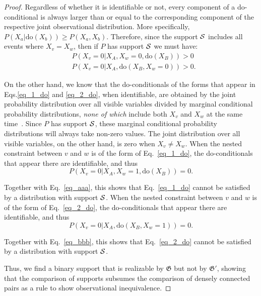 \begin{proof}
	Regardless of whether it is identifiable or not, every component of a do-conditional is always larger than or equal to the corresponding component of the respective joint observational distribution. More specifically, $P(X_a|\text{do}(X_b))\geq P(X_a,X_b)$. Therefore, since the support $\cal S$ includes all events where $X_v= X_w$, then if $P$ has support $\cal S$ we must have:
	\begin{align}
		& P(X_v=0|X_A,X_w=0,\text{do}(X_B)) >0 \label{eq_aaa} \\
		& P(X_v=0|X_A,\text{do}(X_B, X_w=0)) >0.  \label{eq_bbb}
	\end{align}
	
	On the other hand, we know that the do-conditionals of the forms that appear in Eqs.\eqref{eq_1_do} and \eqref{eq_2_do}, when identifiable, are obtained by the joint probability distribution over all visible variables divided by marginal conditional probability distributions, \emph{none of which} include both $X_v$ and $X_w$ at the same time~\cite{causality_pearl}. Since $P$ has support $\cal S$, these marginal conditional probability distributions will always take non-zero values. The joint distribution over all visible variables, on the other hand, is zero when $X_v\neq X_w$. When the nested constraint between $v$ and $w$ is of the form of Eq.~\eqref{eq_1_do}, the do-conditionals that appear there are identifiable, and thus
	\begin{equation}
		P(X_v=0|X_A,X_w=1,\text{do}(X_B)) =0.
	\end{equation}
	
	Together with Eq.~\eqref{eq_aaa}, this shows that Eq.~\eqref{eq_1_do} cannot be satisfied by a distribution with support $\cal S$.  When the nested constraint between $v$ and $w$ is of the form of Eq.~\eqref{eq_2_do}, the do-conditionals that appear there are identifiable, and thus
	\begin{equation}
		P(X_v=0|X_A,\text{do}(X_B, X_w=1))  =0.
	\end{equation}
	
	Together with Eq.~\eqref{eq_bbb}, this shows that Eq.~\eqref{eq_2_do} cannot be satisfied by a distribution with support $\cal S$. 
	

	
	
	
	Thus, we find a binary support that is realizable by   $\mathfrak{G}$ but not by  $\mathfrak{G}'$, showing that the comparison of supports subsumes the comparison of densely connected pairs as a rule to show observational inequivalence.
	
\end{proof}

